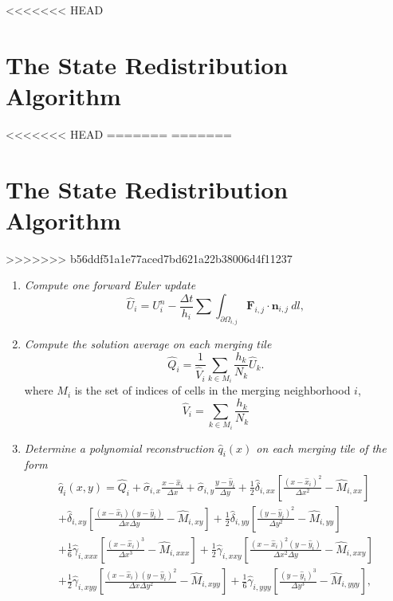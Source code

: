 <<<<<<< HEAD
\section{The State Redistribution Algorithm}\label{srdAlg}
<<<<<<< HEAD
=======
=======
\section{The State Redistribution Algorithm}\label{sec:srdAlg}
>>>>>>> b56ddf51a1e77aced7bd621a22b38006d4f11237
\begin{enumerate}[label=Step \arabic*:]
    \item \textit{Compute one forward Euler update}
    \begin{equation} 
    \hat{U}_i = U^n_i - \frac{\Delta t}{h_i}\sum \int_{\partial \Omega_{i,j}} \mathbf{F}_{i,j} \cdot \mathbf{n}_{i,j}~dl,\label{eq:scheme}
    \end{equation}
	\item \textit{Compute the solution average on each merging tile}
	\begin{equation}\label{eq:q_avg1}
	    \hat Q_i =  \frac{1}{\hat V_i}\sum_{k \in M_i}\frac{h_k}{N_k} \hat U_k.
	\end{equation}
	where $M_i$ is the set of indices of cells in the merging neighborhood $i$, 
	\begin{equation}\label{eq:modV}
	\hat V_i = \sum_{k \in M_i}\frac{h_k}{N_k}
	\end{equation}
\item \textit{Determine a polynomial reconstruction $\hat q_i(x)$ on each merging tile of the form}
\begin{equation}\label{eq:q}
\begin{aligned}
	    \hat q_i(x,y) = \hat Q_{i} + \hat \sigma_{i,x}\frac{x-\hat x_i}{\Delta x} +  \hat \sigma_{i,y}\frac{y-\hat y_i}{\Delta y} + \frac{1}{2}\hat \delta_{i, xx}\left[ \frac{(x - \hat x_i)^2 }{\Delta x^2} - \hat M_{i,xx}\right]\\
	    +\hat \delta_{i, xy}\left[ \frac{(x - \hat x_i) (y - \hat y_i) }{\Delta x \Delta y} - \hat M_{i,xy}\right] + \frac{1}{2}\hat \delta_{i, yy}\left[ \frac{(y - \hat y_i)^2 }{\Delta y^2} -  \hat M_{i,yy}\right]\\
	    + \frac{1}{6}\hat\gamma_{i, xxx}\left[ \frac{(x -  \hat x_i)^3 }{\Delta x^3} -  \hat M_{i,xxx}\right] + \frac{1}{2}\hat \gamma_{i, xxy}\left[ \frac{(x - \hat x_i)^2 (y -  \hat y_i) }{\Delta x^2 \Delta y} -  \hat M_{i,xxy}\right]\\
	     + \frac{1}{2}\hat \gamma_{i, xyy}\left[ \frac{(x -  \hat x_i) (y -  \hat y_i)^2 }{\Delta x \Delta y ^2} -  \hat M_{i,xyy}\right]+ \frac{1}{6}\hat \gamma_{i, yyy}\left[ \frac{(y -  \hat y_i)^3 }{\Delta y^3} -  \hat M_{i,yyy}\right],

\end{aligned}
\end{equation}
\end{enumerate}
